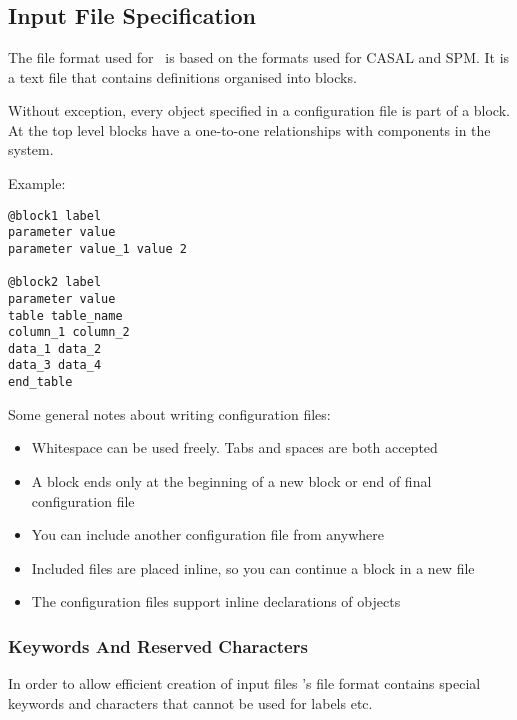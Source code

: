 
\section{\label{sec:examples}}

\subsection{Input File Specification}

The file format used for \CNAME\ is based on the formats used for CASAL and SPM. It is a text file that contains definitions organised into blocks.

Without exception, every object specified in a configuration file is part of a block. At the top level blocks have a one-to-one relationships with components in the system.

Example:

{\small{\begin{verbatim}
@block1 label
parameter value
parameter value_1 value 2

@block2 label
parameter value
table table_name
column_1 column_2
data_1 data_2
data_3 data_4
end_table
\end{verbatim}}}

Some general notes about writing configuration files:

\begin{itemize}
	\item Whitespace can be used freely. Tabs and spaces are both accepted
	\item A block ends only at the beginning of a new block or end of final configuration file
	\item You can include another configuration file from anywhere
	\item Included files are placed inline, so you can continue a block in a new file
	\item The configuration files support inline declarations of objects
\end{itemize}

\subsubsection{Keywords And Reserved Characters}

In order to allow efficient creation of input files \CNAME's file format contains special keywords and characters that cannot be used for labels etc.

